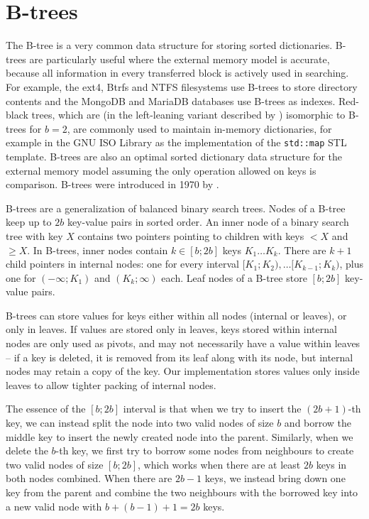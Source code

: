\chapter{B-trees}
\label{chapter:btree}
The B-tree is a very common data structure for storing sorted dictionaries.
B-trees are particularly useful where the external memory model is accurate,
because all information in every transferred block is actively used
in searching. For example, the ext4, Btrfs and NTFS filesystems use B-trees
to store directory contents and the MongoDB and MariaDB databases use B-trees
as indexes.  %
Red-black trees, which are (in the left-leaning variant
described by \cite{left-leaning}) isomorphic to B-trees for $b=2$, are
commonly used to maintain in-memory dictionaries, for example in the GNU ISO
\Cpp Library as the implementation of the \texttt{std::map} STL template.
B-trees are also an optimal sorted dictionary data structure
for the external memory model assuming the only operation allowed on
keys is comparison.
B-trees were introduced in 1970 by \cite{btree}.

B-trees are a generalization of balanced binary search trees.
Nodes of a B-tree keep up to $2b$ key-value pairs in sorted order.
An inner node of a binary search tree with key $X$ contains two pointers
pointing to children with keys $< X$ and $\geq X$. In B-trees,
inner nodes contain $k\in[b;2b]$ keys $K_1\ldots K_k$. There are $k+1$
child pointers in internal nodes: one for every interval
$[K_1;K_2),\ldots [K_{k-1};K_k)$, plus one for $(-\infty;K_1)$ and
$(K_k;\infty)$ each.
Leaf nodes of a B-tree store $[b;2b]$ key-value pairs.

B-trees can store values for keys either within all nodes (internal or leaves),
or only in leaves. If values are stored only in leaves, keys stored
within internal nodes are only used as pivots, and may not necessarily
have a value within leaves -- if a key is deleted, it is removed from its leaf
along with its node, but internal nodes may retain a copy of the key.
Our implementation stores values only inside leaves to allow tighter packing
of internal nodes.

The essence of the $[b;2b]$ interval is that when we try to insert
the $(2b+1)$-th key, we can instead split the node into two valid nodes of size
$b$ and borrow the middle key to insert the newly created node into the parent.
Similarly, when we delete the $b$-th key, we first try to borrow some nodes
from neighbours to create two valid nodes of size $[b;2b]$, which works when
there are at least $2b$ keys in both nodes combined.
When there are $2b-1$ keys, we instead bring down one key from the parent
and combine the two neighbours with the borrowed key into a new valid node with
$b+(b-1)+1=2b$ keys.

